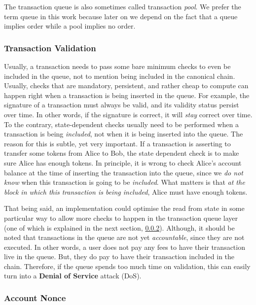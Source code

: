 \begin{remark}
	The transaction queue is also sometimes called transaction \textit{pool}. We prefer the term
	queue in this work because later on we depend on the fact that a queue implies order while a
	pool implies no order.
\end{remark}

\subsubsection{Transaction Validation} \label{chap_bg:subsec:validation}

Usually, a transaction needs to pass some bare minimum checks to even be included in the queue, not
to mention being included in the canonical chain. Usually, checks that are mandatory, persistent,
and rather cheap to compute can happen right when a transaction is being inserted in the queue. For
example, the signature of a transaction must always be valid, and its validity status persist over
time. In other words, if the signature is correct, it will \textit{stay} correct over time. To the
contrary, state-dependent checks usually need to be performed when a transaction is being
\textit{included}, not when it is being inserted into the queue. The reason for this is subtle, yet
very important. If a transaction is asserting to transfer some tokens from Alice to Bob, the state
dependent check is to make sure Alice has enough tokens. In principle, it is wrong to check Alice's
account balance at the time of inserting the transaction into the queue, since we \textit{do not
know} when this transaction is going to be \textit{included}. What matters is that \textit{at the
block in which this transaction is being included}, Alice must have enough tokens.

That being said, an implementation could optimise the read from state in some particular way to
allow more checks to happen in the transaction queue layer (one of which is explained in the next
section, \ref{chap_bg:subsec:nonce}). Although, it should be noted that transactions in the queue
are not yet \textit{accountable}, since they are not executed. In other words, a user does not pay
any fees to have their transaction live in the queue. But, they do pay to have their transaction
included in the chain. Therefore, if the queue spends too much time on validation, this can easily
turn into a \textbf{Denial of Service} attack (DoS).

\subsubsection{Account Nonce} \label{chap_bg:subsec:nonce}

